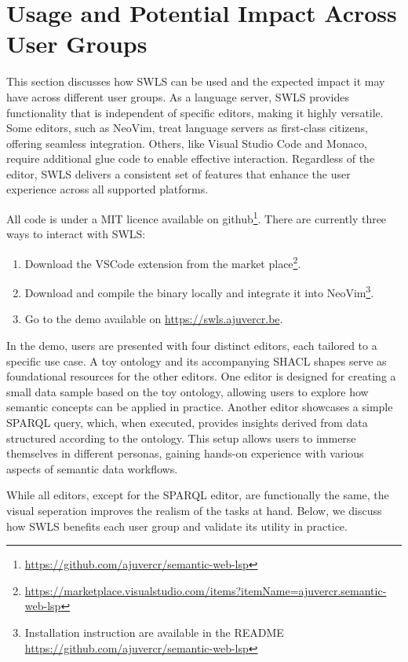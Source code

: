 \section{Usage and Potential Impact Across User Groups}%
\label{sec:usage}

This section discusses how SWLS can be used and the expected impact it may have across different user groups.
As a language server, SWLS provides functionality that is independent of specific editors, making it highly versatile.
Some editors, such as NeoVim, treat language servers as first-class citizens, offering seamless integration.
Others, like Visual Studio Code and Monaco, require additional glue code to enable effective interaction.
Regardless of the editor, SWLS delivers a consistent set of features that enhance the user experience across all supported platforms.

All code is under a MIT licence available on github\footnote{\url{https://github.com/ajuvercr/semantic-web-lsp}}.
There are currently three ways to interact with SWLS:
\begin{enumerate}
  \item Download the VSCode extension from the market place\footnote{\url{https://marketplace.visualstudio.com/items?itemName=ajuvercr.semantic-web-lsp}}.
  \item Download and compile the binary locally and integrate it into NeoVim\footnote{Installation instruction are available in the README \url{https://github.com/ajuvercr/semantic-web-lsp}}.
  \item Go to the demo available on \url{https://swls.ajuvercr.be}.
\end{enumerate}

In the demo, users are presented with four distinct editors, each tailored to a specific use case.
A toy ontology and its accompanying SHACL shapes serve as foundational resources for the other editors.
One editor is designed for creating a small data sample based on the toy ontology, allowing users to explore how semantic concepts can be applied in practice.
Another editor showcases a simple SPARQL query, which, when executed, provides insights derived from data structured according to the ontology.
This setup allows users to immerse themselves in different personas, gaining hands-on experience with various aspects of semantic data workflows.

While all editors, except for the SPARQL editor, are functionally the same, 
the visual seperation improves the realism of the tasks at hand.
Below, we discuss how SWLS benefits each user group and validate its utility in practice.

